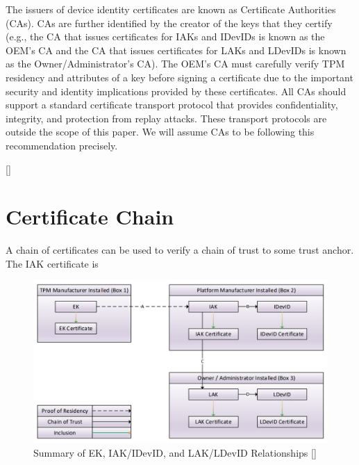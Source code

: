 The issuers of device identity certificates are known as Certificate Authorities (CAs). CAs are further identified by the creator of the keys that they certify (e.g., the CA that issues certificates for IAKs and IDevIDs is known as the OEM's CA and the CA that issues certificates for LAKs and LDevIDs is known as the Owner/Administrator's CA). 
The OEM's CA must carefully verify TPM residency and attributes of a key before signing a certificate due to the important security and identity implications provided by these certificates. 
All CAs should support a standard certificate transport protocol that provides confidentiality, integrity, and protection from replay attacks. These transport protocols are outside the scope of this paper. We will assume CAs to be following this recommendation precisely.



[\cite{KeyManagement}]

\section{Certificate Chain}

A chain of certificates can be used to verify a chain of trust to some trust anchor. The IAK certificate is 


\begin{figure}[h]
  \begin{centering}
  \includegraphics[width=.8\linewidth]{chap_3_figures/certificateRelationships.jpg}
  \par\end{centering}
  \caption{Summary of EK, IAK/IDevID, and LAK/LDevID Relationships [\cite{DevIDSpec-TCG}]}
  \label{fig:cert_rel}
\end{figure}

